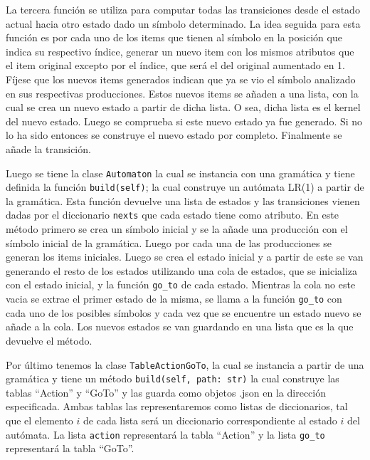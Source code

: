 La tercera funci\'on se utiliza para computar todas las transiciones desde el estado actual hacia otro estado dado un s\'imbolo determinado. La idea seguida para esta funci\'on es por cada uno de los items que tienen al s\'imbolo en la posici\'on que indica su respectivo \'indice, generar un nuevo item con los mismos atributos que el item original excepto por el \'indice, que ser\'a el del original aumentado en 1. F\'ijese que los nuevos items generados indican que ya se vio el s\'imbolo analizado en sus respectivas producciones. Estos nuevos items se a\~{n}aden a una lista, con la cual se crea un nuevo estado a partir de dicha lista. O sea, dicha lista es el kernel del nuevo estado. Luego se comprueba si este nuevo estado ya fue generado. Si no lo ha sido entonces se construye el nuevo estado por completo. Finalmente se a\~{n}ade la transici\'on.

Luego se tiene la clase \verb|Automaton| la cual se instancia con una gram\'atica y tiene definida la funci\'on \verb|build(self)|; la cual construye un aut\'omata LR(1) a partir de la gram\'atica. Esta funci\'on devuelve una lista de estados y las transiciones vienen dadas por el diccionario \verb|nexts| que cada estado tiene como atributo. En este m\'etodo primero se crea un s\'imbolo inicial y se la a\~{n}ade una producci\'on con el s\'imbolo inicial de la gram\'atica. Luego por cada una de las producciones se generan los items iniciales. Luego se crea el estado inicial y a partir de este se van generando el resto de los estados utilizando una cola de estados, que se inicializa con el estado inicial, y la funci\'on \verb|go_to| de cada estado.  Mientras la cola no este vacia se extrae el primer estado de la misma, se llama a la funci\'on \verb|go_to| con cada uno de los posibles s\'imbolos y cada vez que se encuentre un estado nuevo se a\~{nade} a la cola. Los nuevos estados se van guardando en una lista que es la que devuelve el m\'etodo.

Por \'ultimo tenemos la clase \verb|TableActionGoTo|, la cual se instancia a partir de una gram\'atica y tiene un m\'etodo \verb|build(self, path: str)| la cual construye las tablas ``Action'' y ``GoTo'' y las guarda como objetos .json en la direcci\'on especificada. Ambas tablas las representaremos como listas de diccionarios, tal que el elemento $i$ de cada lista ser\'a un diccionario correspondiente al estado $i$ del aut\'omata. La lista \verb|action| representar\'a la tabla ``Action'' y la lista \verb|go_to| representar\'a la tabla ``GoTo''.


